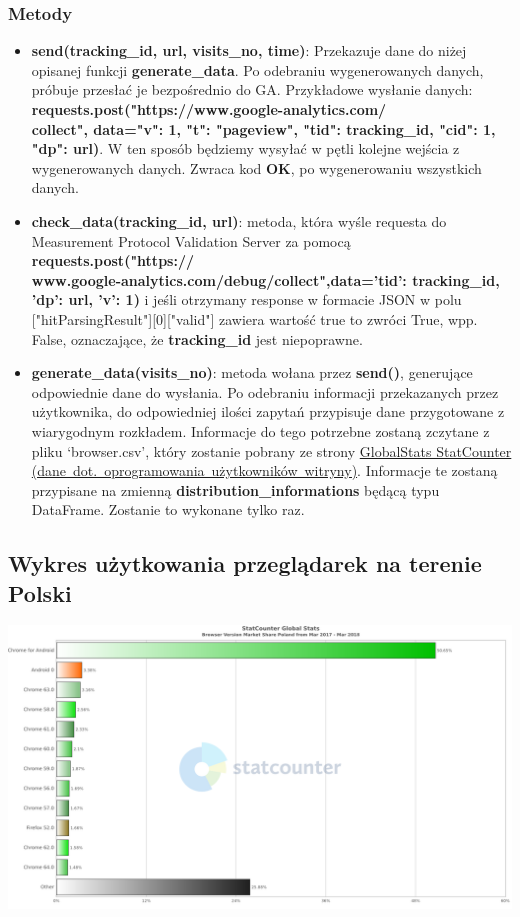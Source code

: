 \documentclass{article}
\begin{document}
\subsubsection{Metody}
\begin{itemize}
\item \textbf{send(tracking\_id, url, visits\_no, time)}: Przekazuje dane do niżej opisanej funkcji \textbf{generate\_data}. Po odebraniu wygenerowanych danych, próbuje przesłać je bezpośrednio do GA\@. Przykładowe wysłanie danych: \textbf{requests.post("https://www.google-analytics.com/\\collect", data={"v":  1, "t": "pageview", "tid": tracking\_id, "cid": 1, "dp": url})}. W ten sposób będziemy wysyłać w pętli kolejne wejścia z wygenerowanych danych. Zwraca kod \textbf{OK}, po wygenerowaniu wszystkich danych.

\item \textbf{check\_data(tracking\_id, url)}: metoda, która wyśle requesta do Measurement Protocol Validation Server za pomocą \textbf{requests.post("https://\\www.google-analytics.com/debug/collect",data={'tid': tracking\_id, 'dp': url, 'v': 1})} i jeśli otrzymany response w formacie JSON w polu ["hitParsingResult"][0]["valid"] zawiera wartość true to zwróci True, wpp. False, oznaczające, że \textbf{tracking\_id} jest niepoprawne.

\item \textbf{generate\_data(visits\_no)}: metoda wołana przez \textbf{send()}, generujące odpowiednie dane do wysłania. Po odebraniu informacji przekazanych przez użytkownika, do odpowiedniej ilości zapytań przypisuje dane przygotowane z wiarygodnym rozkładem. Informacje do tego potrzebne zostaną zczytane z pliku `browser.csv', który zostanie pobrany ze strony \href{http://gs.statcounter.com/browser-version-market-share/all/poland#monthly-201703-201803-bar}{GlobalStats StatCounter (dane\ dot.\ oprogramowania\ użytkowników\ witryny)}. Informacje te zostaną przypisane na zmienną \textbf{distribution\_informations} będącą typu DataFrame. Zostanie to wykonane tylko raz.
\end{itemize}

\subsection{Wykres użytkowania przeglądarek na terenie Polski}
\begin{center}\includegraphics[scale=0.25]{chart}\end{center}
\end{document}
